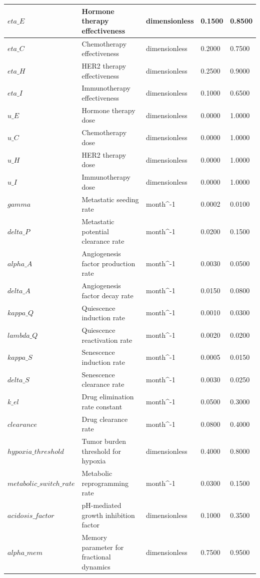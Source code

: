 \documentclass{article}
\begin{document}
\begin{longtable}{|p{3cm}|p{6cm}|p{2cm}|p{1.5cm}|p{1.5cm}|}
\hline
$eta\_E$ & Hormone therapy effectiveness & dimensionless & 0.1500 & 0.8500 \\
\hline
$eta\_C$ & Chemotherapy effectiveness & dimensionless & 0.2000 & 0.7500 \\
\hline
$eta\_H$ & HER2 therapy effectiveness & dimensionless & 0.2500 & 0.9000 \\
\hline
$eta\_I$ & Immunotherapy effectiveness & dimensionless & 0.1000 & 0.6500 \\
\hline
$u\_E$ & Hormone therapy dose & dimensionless & 0.0000 & 1.0000 \\
\hline
$u\_C$ & Chemotherapy dose & dimensionless & 0.0000 & 1.0000 \\
\hline
$u\_H$ & HER2 therapy dose & dimensionless & 0.0000 & 1.0000 \\
\hline
$u\_I$ & Immunotherapy dose & dimensionless & 0.0000 & 1.0000 \\
\hline
$gamma$ & Metastatic seeding rate & month^{-1} & 0.0002 & 0.0100 \\
\hline
$delta\_P$ & Metastatic potential clearance rate & month^{-1} & 0.0200 & 0.1500 \\
\hline
$alpha\_A$ & Angiogenesis factor production rate & month^{-1} & 0.0030 & 0.0500 \\
\hline
$delta\_A$ & Angiogenesis factor decay rate & month^{-1} & 0.0150 & 0.0800 \\
\hline
$kappa\_Q$ & Quiescence induction rate & month^{-1} & 0.0010 & 0.0300 \\
\hline
$lambda\_Q$ & Quiescence reactivation rate & month^{-1} & 0.0020 & 0.0200 \\
\hline
$kappa\_S$ & Senescence induction rate & month^{-1} & 0.0005 & 0.0150 \\
\hline
$delta\_S$ & Senescence clearance rate & month^{-1} & 0.0030 & 0.0250 \\
\hline
$k\_el$ & Drug elimination rate constant & month^{-1} & 0.0500 & 0.3000 \\
\hline
$clearance$ & Drug clearance rate & month^{-1} & 0.0800 & 0.4000 \\
\hline
$hypoxia\_threshold$ & Tumor burden threshold for hypoxia & dimensionless & 0.4000 & 0.8000 \\
\hline
$metabolic\_switch\_rate$ & Metabolic reprogramming rate & month^{-1} & 0.0300 & 0.1500 \\
\hline
$acidosis\_factor$ & pH-mediated growth inhibition factor & dimensionless & 0.1000 & 0.3500 \\
\hline
$alpha\_mem$ & Memory parameter for fractional dynamics & dimensionless & 0.7500 & 0.9500 \\
\hline
\end{longtable}
\end{document}
